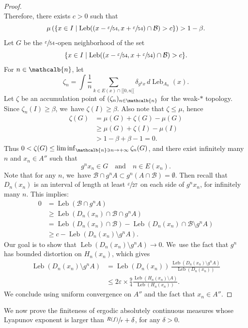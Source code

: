 \documentclass[JEP,XML,SOM,Unicode,NoFloatCountersInSection,published]{cedram}
\DeclareMathOperator{\Leb}{Leb}
\newcommand{\mcbn}{{\mathcalb{n}}}
\theoremstyle{definition}
\begin{document}
\begin{proof}
\[\]
Therefore, there exists $c > 0$ such that
\[
\mu \left (\{ x \in I \mid \Leb((x - \sfrac{\varepsilon}{54}, x + \sfrac{\varepsilon}{54}) \cap \mathcal{B}) > c \} \right) > 1 - \beta.
\]
Let $G$ be the $\sfrac{\varepsilon}{54}$-open neighborhood of the set
\[
\{ x \in I \mid \Leb((x - \sfrac{\varepsilon}{54}, x + \sfrac{\varepsilon}{54}) \cap \mathcal{B}) > c \}.
\]
For $n \in \mcbn$, let
\[
\zeta_n = \int \frac{1}{n} \sum_{k \in E(x) \cap [\![ 0, n [\![} \delta_{g^k x}\, d \Leb_{A_n}(x).
\]
Let $\zeta$ be an accumulation point of $(\zeta_n)_{n \in \mcbn}$ for the weak\nobreakdash-$*$ topology.
Since $\zeta_n(I) \geq \beta$, we~have $\zeta(I) \geq \beta$.
Also note that $\zeta \leq \mu$, hence
\begin{align*}
\zeta(G) &= \mu(G) + \zeta(G) - \mu(G)\\
&\geq \mu(G) + \zeta(I) - \mu(I)\\
&> 1- \beta + \beta - 1 = 0.
\end{align*}
Thus $0 < \zeta(G) \leq \liminf_{\mcbn \ni n \to +\infty} \zeta_n(G)$, and there exist infinitely many $n$ and $x_n \in A''$ such that
\[
g^n x_n \in G \quad\text{and} \quad n \in E(x_n).
\]
Note that for any $n$, we~have $\mathcal{B} \cap g^n A \subset g^n(A \cap \mathcal{B}) = \emptyset$.
Then recall that $D_n(x_n)$ is an interval of length at least $\sfrac{\varepsilon}{27}$ on each side of $g^n x_n$, for infinitely many $n$.
This implies:
\begin{align*}
0 &= \Leb(\mathcal{B} \cap g^n A)\\
&\geq \Leb(D_n(x_n) \cap \mathcal{B} \cap g^n A)\\
&= \Leb(D_n(x_n) \cap \mathcal{B}) - \Leb(D_n(x_n) \cap \mathcal{B} \setminus g^n A)\\
&\geq c - \Leb(D_n(x_n) \setminus g^n A).
\end{align*}
Our goal is to show that $\Leb(D_n(x_n) \setminus g^n A) \to 0$. We~use the fact that $g^n$ has bounded distortion on $H_n(x_n)$, which gives
\begin{align*}
\Leb(D_n(x_n) \setminus g^n A) &= \Leb(D_n(x_n))\, \frac{\Leb(D_n(x_n) \setminus g^n A)}{\Leb(D_n(x_n))}\\
&\leq 2 \varepsilon \times \frac{9}{4} \frac{\Leb(H_n(x_n) \setminus A)}{\Leb(H_n(x_n))}.
\end{align*}
We conclude using uniform convergence on $A''$ and the fact that $x_n \in A''$.
\end{proof}

We now prove the finiteness of ergodic absolutely continuous measures whose Lyapunov exponent is larger than $\sfrac{R(f)}{r} + \delta$, for any $\delta > 0$.
\end{document}
